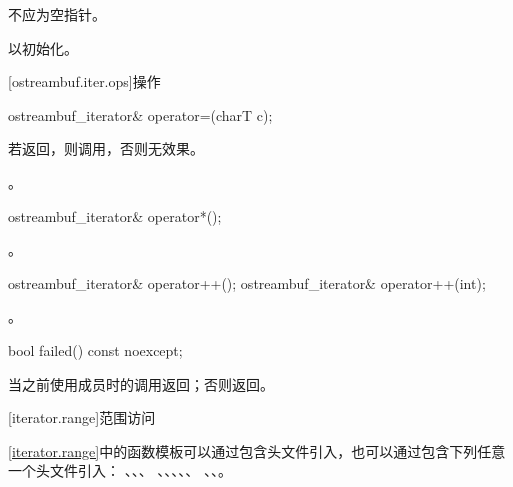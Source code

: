 \begin{itemdescr}
\pnum
\requires
{}不应为空指针。

\pnum
\effects
以初始化。
\end{itemdescr}

[ostreambuf.iter.ops]{操作}

%
\begin{itemdecl}
ostreambuf_iterator& operator=(charT c);
\end{itemdecl}

\begin{itemdescr}
\pnum
\effects
若返回，则调用，否则无效果。

\pnum
\returns
{}。
\end{itemdescr}

%
\begin{itemdecl}
ostreambuf_iterator& operator*();
\end{itemdecl}

\begin{itemdescr}
\pnum
\returns
{}。
\end{itemdescr}

%
\begin{itemdecl}
ostreambuf_iterator& operator++();
ostreambuf_iterator& operator++(int);
\end{itemdecl}

\begin{itemdescr}
\pnum
\returns
{}。
\end{itemdescr}

%
\begin{itemdecl}
bool failed() const noexcept;
\end{itemdecl}

\begin{itemdescr}
\pnum
\returns
{}当之前使用成员时的调用返回；否则返回。
\end{itemdescr}

[iterator.range]{范围访问}

\pnum
\ref{iterator.range}中的函数模板可以通过包含头文件引入，也可以通过包含下列任意一个头文件引入：
、、、
、、、、、
、、。

